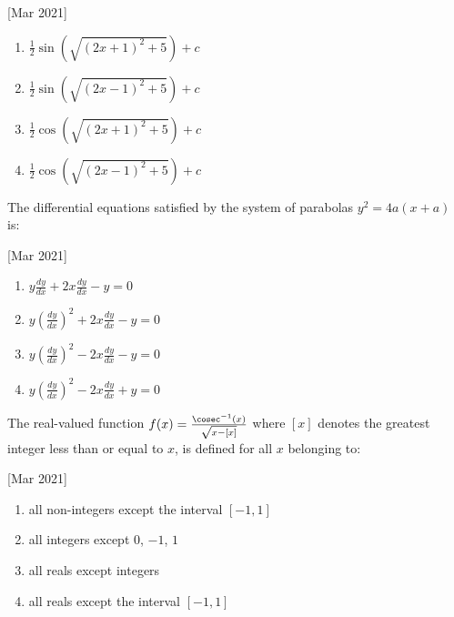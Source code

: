 	\hfill{[Mar 2021]}
	\begin{multicols}{2}
               \begin{enumerate}
    \item $ \frac{1}{2} \sin\left(\sqrt{(2x + 1)^2 + 5}\right) + c $
    \item $ \frac{1}{2} \sin\left(\sqrt{(2x - 1)^2 + 5}\right) + c $
    \item $ \frac{1}{2} \cos\left(\sqrt{(2x + 1)^2 + 5}\right) + c $
    \item $ \frac{1}{2} \cos\left(\sqrt{(2x - 1)^2 + 5}\right) + c $
               \end{enumerate}
	\end{multicols}
       \item
	       The differential equations satisfied by the system of parabolas $ y^2 = 4a(x + a)$ is:

		\hfill{[Mar 2021]}
		\begin{multicols}{2}
	       \begin{enumerate}
    \item $ y \frac{dy}{dx} + 2x \frac{dy}{dx} - y = 0 $
    \item $ y \left(\frac{dy}{dx}\right)^2 + 2x \frac{dy}{dx} - y = 0 $
    \item $ y \left(\frac{dy}{dx}\right)^2 - 2x \frac{dy}{dx} - y = 0 $
    \item $ y \left(\frac{dy}{dx}\right)^2 - 2x \frac{dy}{dx} + y = 0 $
               \end{enumerate}
		\end{multicols}
       \item
	       The real-valued function $ f(x) = \frac{\cosec^{-1}(x)}{\sqrt{x - [x]}}$ where $[x]$ denotes the greatest integer less than or equal to $x$, is defined for all $x$ belonging to:

		\hfill{[Mar 2021]}
		\begin{multicols}{1}
	       \begin{enumerate}
    \item all non-integers except the interval $[-1, 1]$
    \item all integers except $0$, $-1$, $1$
    \item all reals except integers
    \item all reals except the interval $[-1, 1]$
               \end{enumerate}
		\end{multicols}
